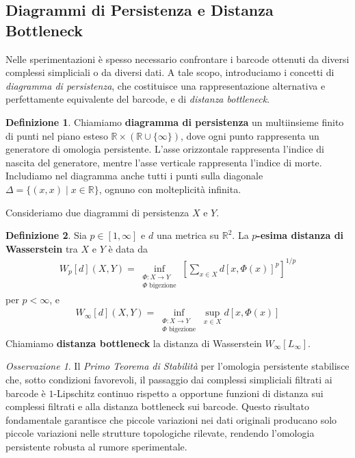 \documentclass[a4paper, 12pt]{article}
\theoremstyle{definition}
\newtheorem{definition}{Definizione}[section]
\theoremstyle{remark}
\newtheorem{remark}[theorem]{Osservazione}
\begin{document}
\subsection{Diagrammi di Persistenza e Distanza Bottleneck}

Nelle sperimentazioni è spesso necessario confrontare i barcode ottenuti da diversi complessi simpliciali o da diversi dati. A tale scopo, introduciamo i concetti di \textit{diagramma di persistenza}, che costituisce una rappresentazione alternativa e perfettamente equivalente del barcode, e di \textit{distanza bottleneck}.

\begin{definition}
    Chiamiamo \textbf{diagramma di persistenza} un multiinsieme finito di punti nel piano esteso $\mathbb{R} \times \left(\mathbb{R} \cup \{\infty\}\right)$, dove ogni punto rappresenta un generatore di omologia persistente. L'asse orizzontale rappresenta l'indice di nascita del generatore, mentre l'asse verticale rappresenta l'indice di morte. Includiamo nel diagramma anche tutti i punti sulla diagonale $\Delta=\{(x,x) \mid x \in \mathbb{R}\}$, ognuno con molteplicità infinita.
\end{definition}

Consideriamo due diagrammi di persistenza $X$ e $Y$.

\begin{definition}
    Sia $p \in [1, \infty]$ e $d$ una metrica su $\mathbb{R}^2$. La \textbf{$p$-esima distanza di Wasserstein} tra $X$ e $Y$ è data da
    \begin{align*}
        W_p[d] (X,Y) = \inf_{\substack{\Phi: X \to Y\\ \Phi \text{ bigezione}}}\left[ \sum_{x \in X} d[x, \Phi(x)]^p \right]^{1/p}
    \end{align*}
    per $p < \infty$, e
    \begin{align*}
        W_{\infty}[d] (X,Y) = \inf_{\substack{\Phi: X \to Y\\ \Phi \text{ bigezione}}} \sup_{x \in X} d[x, \Phi(x)]
    \end{align*}
    Chiamiamo \textbf{distanza bottleneck} la distanza di Wasserstein $W_{\infty}[L_{\infty}]$.
\end{definition}

\begin{remark}
    Il \textit{Primo Teorema di Stabilità}\cite{Cohen} per l'omologia persistente stabilisce che, sotto condizioni favorevoli, il passaggio dai complessi simpliciali filtrati ai barcode è $1$-Lipschitz continuo rispetto a opportune funzioni di distanza sui complessi filtrati e alla distanza bottleneck sui barcode. Questo risultato fondamentale garantisce che piccole variazioni nei dati originali producano solo piccole variazioni nelle strutture topologiche rilevate, rendendo l'omologia persistente robusta al rumore sperimentale.
\end{remark}
\end{document}
